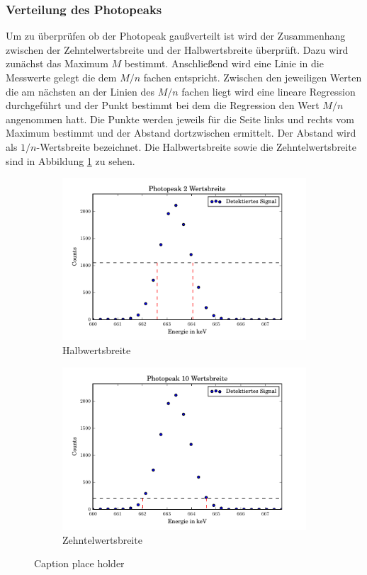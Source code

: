 \subsubsection{Verteilung des Photopeaks}
Um zu überprüfen ob der Photopeak gaußverteilt ist wird der Zusammenhang zwischen der Zehntelwertsbreite und der Halbwertsbreite überprüft. Dazu wird zunächst das Maximum $M$ bestimmt. Anschließend wird eine Linie in die Messwerte gelegt die dem $M/n$ fachen entspricht. Zwischen den jeweiligen Werten die am nächsten an der Linien des $M/n$ fachen liegt wird eine lineare Regression durchgeführt und der Punkt bestimmt bei dem die Regression den Wert $M/n$ angenommen hatt. Die Punkte werden jeweils für die Seite links und rechts vom Maximum bestimmt und der Abstand dortzwischen ermittelt. Der Abstand wird als $1/n$-Wertsbreite bezeichnet.
Die Halbwertsbreite sowie die Zehntelwertsbreite sind in Abbildung \ref{fig:Halb} zu sehen.
\begin{figure}[htpb]
	\centering
	\begin{subfigure}[t]{0.5\textwidth}
		\centering
		\includegraphics[width=\textwidth]{./build/2Wertsbreite.pdf}
		\caption{Halbwertsbreite}
	\end{subfigure}%
	\begin{subfigure}[t]{0.5\textwidth}
		\centering
		\includegraphics[width=\textwidth]{./build/10Wertsbreite.pdf}
		\caption{Zehntelwertsbreite}
	\end{subfigure}
	\caption{Caption place holder}
	\label{fig:Halb}
\end{figure}
